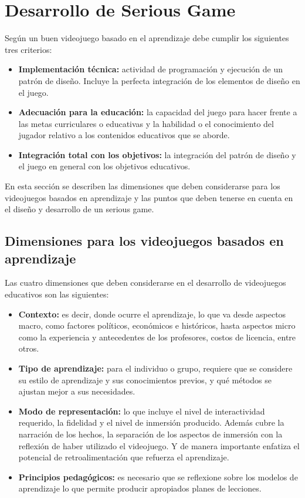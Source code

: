 \section{Desarrollo de Serious Game} \label{sec:desarrollo}

Según \cite{education:games} un buen videojuego basado en el aprendizaje debe cumplir  los siguientes tres criterios:

\begin{itemize}
\item \textbf{Implementación técnica:} actividad de programación y ejecución de un patrón de diseño. Incluye la perfecta integración de los elementos de diseño en el juego.
\item \textbf{Adecuación para la educación:} la capacidad del juego para hacer frente a las metas curriculares o educativas y la habilidad o el conocimiento del jugador relativo a los contenidos educativos que se aborde.
\item \textbf{Integración total con los objetivos:} la integración del patrón de diseño y el juego en general con los objetivos educativos.
\end{itemize}

En esta sección se describen las dimensiones que deben considerarse para los videojuegos basados en  aprendizaje y las puntos que deben tenerse en cuenta en el diseño y desarrollo  de un serious game. 


\subsection{Dimensiones para los videojuegos basados en aprendizaje}

Las cuatro dimensiones que deben considerarse en el desarrollo de videojuegos educativos son las  siguientes\cite{education:games}:

\begin{itemize}
\item \textbf{Contexto:} es decir, donde ocurre el aprendizaje, lo que va desde aspectos macro, como  factores políticos, económicos e históricos, hasta aspectos micro como la experiencia y  antecedentes de los profesores, costos de licencia, entre otros.
\item \textbf{Tipo de aprendizaje:} para el individuo o grupo, requiere que se considere su  estilo de aprendizaje y sus conocimientos previos, y qué métodos se ajustan mejor a sus  necesidades.
\item \textbf{Modo de representación:} lo que incluye el nivel de interactividad requerido, la fidelidad y  el nivel de inmersión producido. Además cubre la narración de los hechos, la separación de los  aspectos de inmersión con la reflexión de haber utilizado el videojuego. Y de manera importante  enfatiza el potencial de retroalimentación que refuerza el aprendizaje.
\item \textbf{Principios pedagógicos:} es necesario que se reflexione sobre los modelos de aprendizaje lo  que permite producir apropiados planes de lecciones.
\end{itemize}

